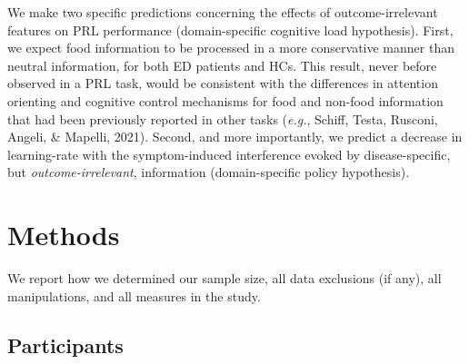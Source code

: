 \documentclass[
  man,floatsintext]{apa6}
\begin{document}
We make two specific predictions concerning the effects of outcome-irrelevant features on PRL performance (domain-specific cognitive load hypothesis). First, we expect food information to be processed in a more conservative manner than neutral information, for both ED patients and HCs. This result, never before observed in a PRL task, would be consistent with the differences in attention orienting and cognitive control mechanisms for food and non-food information that had been previously reported in other tasks (\emph{e.g.}, Schiff, Testa, Rusconi, Angeli, \& Mapelli, 2021). Second, and more importantly, we predict a decrease in learning-rate with the symptom-induced interference evoked by disease-specific, but \emph{outcome-irrelevant}, information (domain-specific policy hypothesis).

\hypertarget{methods}{%
\section{Methods}\label{methods}}

We report how we determined our sample size, all data exclusions (if any), all manipulations, and all measures in the study.

\hypertarget{participants}{%
\subsection{Participants}\label{participants}}
\end{document}
